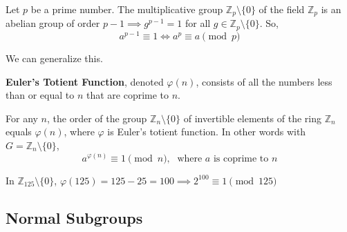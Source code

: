   \begin{corollary}
    Let $p$ be a prime number. The multiplicative group $\mathbb{Z}_{p} \setminus \{0\}$ of the field $\mathbb{Z}_{p}$ is an abelian group of order $p-1 \implies g^{p-1} = 1$ for all $g \in \mathbb{Z}_{p} \setminus \{0\}$. So,
    \begin{equation}
      a^{p-1} \equiv 1 \iff a^{p} \equiv a \pmod{p}
    \end{equation}
  \end{corollary} 

  We can generalize this. 

  \begin{definition}
    \textbf{Euler's Totient Function}, denoted $\varphi(n)$, consists of all the numbers less than or equal to $n$ that are coprime to $n$. 
  \end{definition}

  \begin{theorem}
    For any $n$, the order of the group $\mathbb{Z}_{n} \setminus \{0\}$ of invertible elements of the ring $\mathbb{Z}_{n}$ equals $\varphi(n)$, where $\varphi$ is Euler's totient function. In other words with $G = \mathbb{Z}_{n} \setminus \{0\}$, 
    \begin{equation}
      a^{\varphi(n)} \equiv 1 \pmod{n}, \; \text{ where $a$ is coprime to $n$}
    \end{equation}
  \end{theorem}

  \begin{example}
    In $\mathbb{Z}_{125} \setminus \{0\}$, $\varphi(125) = 125 - 25 = 100 \implies 2^{100} \equiv 1 \pmod{125}$
  \end{example}

\subsection{Normal Subgroups}

